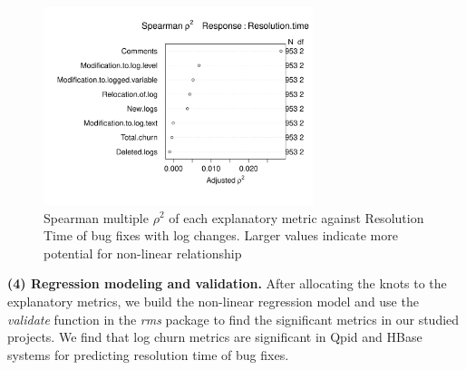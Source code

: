 \begin{figure}[t]
	\begin{minipage}[b]{1\columnwidth}
			\centering 
		\hspace*{-2cm}	\includegraphics[width=0.7\textwidth]{QpidDF}	
		
	\end{minipage}
	\captionsetup{labelsep = colon}
	\hspace*{1.7cm}\caption{Spearman multiple $\rho^{2}$ of each explanatory metric against Resolution Time of bug fixes with log changes. Larger values indicate more potential for non-linear relationship \label{fig:Spearman}}
\end{figure}




\textbf{(4) Regression modeling and validation.} After allocating the knots to the explanatory metrics, we build the non-linear regression model and use the \textsl{validate} function in the \textsl{rms} package to find the significant metrics in our studied projects. We find that log churn metrics are significant in Qpid and HBase systems for predicting resolution time of bug fixes. 

